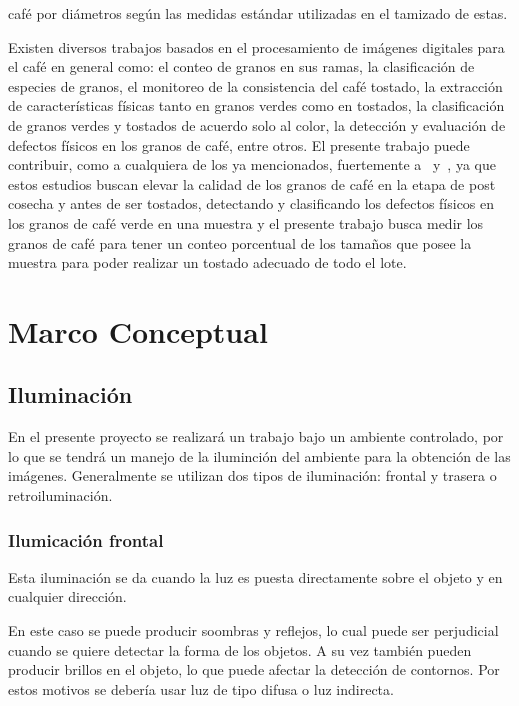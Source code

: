 café por diámetros según las medidas estándar utilizadas en el tamizado de estas.

Existen diversos trabajos basados en el procesamiento de imágenes digitales para el café en general como: el conteo de granos en sus ramas, la clasificación de especies de granos, el monitoreo de la consistencia del café tostado, la extracción de características físicas tanto en granos verdes como en tostados, la clasificación de granos verdes y tostados de acuerdo solo al color, la detección y evaluación de defectos físicos en los granos de café, entre otros. El presente trabajo puede contribuir, como a cualquiera de los ya mencionados, fuertemente a~\citep{Portugal2016} y~\citep{RamirezTicona2016}, ya que estos estudios buscan elevar la calidad de los granos de café en la etapa de post cosecha y antes de ser tostados, detectando y clasificando los defectos físicos en los granos de café verde en una muestra y el presente trabajo busca medir los granos de café para tener un conteo porcentual de los tamaños que posee la muestra para poder realizar un tostado adecuado de todo el lote.


\section{Marco Conceptual}

\subsection{Iluminación}
En el presente proyecto se realizará un trabajo bajo un ambiente controlado, por lo que se tendrá un manejo de la iluminción del ambiente para la obtención de las imágenes. Generalmente se utilizan dos tipos de iluminación: frontal y trasera o retroiluminación.

\subsubsection{Ilumicación frontal}
Esta iluminación se da cuando la luz es puesta directamente sobre el objeto y en cualquier dirección.

En este caso se puede producir soombras y reflejos, lo cual puede ser perjudicial cuando se quiere detectar la forma de los objetos. A su vez también pueden producir brillos en el objeto, lo que puede afectar la detección de contornos. Por estos motivos se debería usar luz de tipo difusa o luz indirecta.

